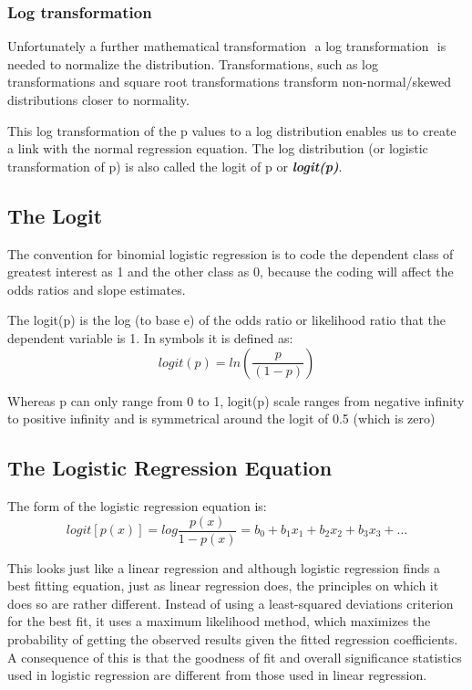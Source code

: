 \documentclass[a4paper,12pt]{article}
\begin{document}
\subsubsection{Log transformation}
Unfortunately a further mathematical transformation  a log transformation  is needed
to normalize the distribution. Transformations, such as log transformations and
square root transformations transform non-normal/skewed distributions closer to normality.

This log transformation of the p values to a log distribution enables us to create a link with the normal regression equation. The log distribution (or logistic transformation of p) is also called the logit of p or \textbf{\textit{logit(p)}}.

\subsection{The Logit}
The convention for binomial logistic regression is to code the
dependent class of greatest interest as 1 and the other class as 0, because the coding will
affect the odds ratios and slope estimates.

The logit(p) is the log (to base e) of the odds ratio or likelihood ratio that the dependent
variable is 1. In symbols it is defined as:
\[ logit(p) = ln \left(\frac{p}{(1-p)}\right) \]

Whereas p can only range from 0 to 1, logit(p) scale ranges from negative infinity to positive
infinity and is symmetrical around the logit of 0.5 (which is zero)

\subsection{The Logistic Regression Equation}
The form of the logistic regression equation is:
\[ logit[p(x)] =  log \frac{p(x)}{1-p(x)}  = b_0 + b_1x_1 + b_2x_2 + b_3x_3 + \ldots \]

This looks just like a linear regression and although logistic regression finds a best
fitting equation, just as linear regression does, the principles on which it does so are
rather different. Instead of using a least-squared deviations criterion for the best fit, it
uses a maximum likelihood method, which maximizes the probability of getting the
observed results given the fitted regression coefficients. A consequence of this is that the
goodness of fit and overall significance statistics used in logistic regression are different
from those used in linear regression.
\end{document}

